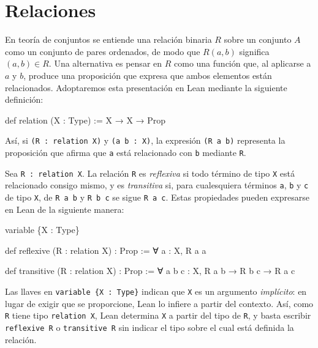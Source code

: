 \documentclass[
  spanish,
  letterpaper,
  DIV=11,
  numbers=noendperiod]{scrreprt}
\newenvironment{Shaded}{\begin{snugshade}}{\end{snugshade}}
\newcommand{\KeywordTok}[1]{\textcolor[rgb]{0.00,0.23,0.31}{\textbf{#1}}}
\newcommand{\NormalTok}[1]{\textcolor[rgb]{0.00,0.23,0.31}{#1}}
\renewcommand{\NormalTok}[1]{\textcolor[HTML]{000000}{#1}}
\renewcommand{\KeywordTok}[1]{\textcolor[HTML]{0000FF}{#1}}
\theoremstyle{remark}
\begin{document}

\chapter{Relaciones}\label{relaciones}

En teoría de conjuntos se entiende una relación binaria \(R\) sobre un
conjunto \(A\) como un conjunto de pares ordenados, de modo que
\(R(a,b)\) significa \((a,b) \in R\). Una alternativa es pensar en \(R\)
como una función que, al aplicarse a \(a\) y \(b\), produce una
proposición que expresa que ambos elementos están relacionados.
Adoptaremos esta presentación en Lean mediante la siguiente definición:

\begin{Shaded}
\begin{Highlighting}[]
\KeywordTok{def}\NormalTok{ relation (X : }\KeywordTok{Type}\NormalTok{) := X → X → }\KeywordTok{Prop}
\end{Highlighting}
\end{Shaded}

Así, si \texttt{(R\ :\ relation\ X)} y \texttt{(a\ b\ :\ X)}, la
expresión \texttt{(R\ a\ b)} representa la proposición que afirma que
\texttt{a} está relacionado con \texttt{b} mediante \texttt{R}.

Sea \texttt{R\ :\ relation\ X}. La relación \texttt{R} es
\emph{reflexiva} si todo término de tipo \texttt{X} está relacionado
consigo mismo, y es \emph{transitiva} si, para cualesquiera términos
\texttt{a}, \texttt{b} y \texttt{c} de tipo \texttt{X}, de
\texttt{R\ a\ b} y \texttt{R\ b\ c} se sigue \texttt{R\ a\ c}. Estas
propiedades pueden expresarse en Lean de la siguiente manera:

\begin{Shaded}
\begin{Highlighting}[]
\NormalTok{variable \{X : }\KeywordTok{Type}\NormalTok{\}}

\KeywordTok{def}\NormalTok{ reflexive (R : relation X) : }\KeywordTok{Prop}\NormalTok{ :=}
\NormalTok{  ∀ a : X, R a a}

\KeywordTok{def}\NormalTok{ transitive (R : relation X) : }\KeywordTok{Prop}\NormalTok{ :=}
\NormalTok{  ∀ a b c : X, R a b → R b c → R a c}
\end{Highlighting}
\end{Shaded}

Las llaves en \texttt{variable\ \{X\ :\ Type\}} indican que \texttt{X}
es un argumento \emph{implícito}: en lugar de exigir que se proporcione,
Lean lo infiere a partir del contexto. Así, como \texttt{R} tiene tipo
\texttt{relation\ X}, Lean determina \texttt{X} a partir del tipo de
\texttt{R}, y basta escribir \texttt{reflexive\ R} o
\texttt{transitive\ R} sin indicar el tipo sobre el cual está definida
la relación.
\end{document}
